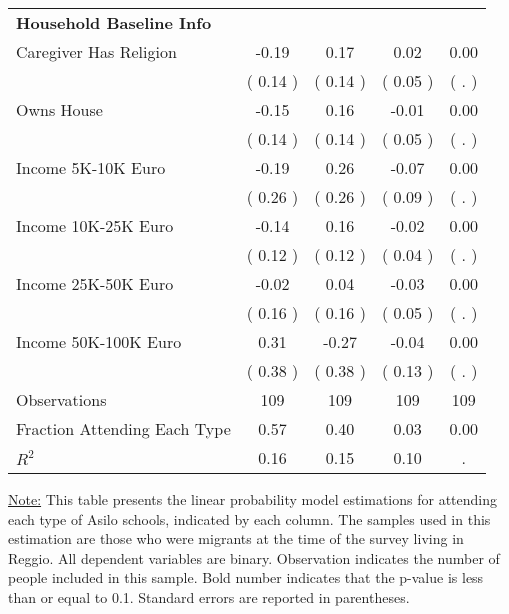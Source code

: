 \begin{table}[H]
{\begin{tabular}{lcccc}
\midrule
\textbf{Household Baseline Info} \\
\quad Caregiver Has Religion &     -0.19 &      0.17 &      0.02 &      0.00 \\
\quad  & (     0.14 ) & (     0.14 )  & (     0.05 )  & (        . )  \\
\quad Owns House &     -0.15 &      0.16 &     -0.01 &      0.00 \\
\quad  & (     0.14 ) & (     0.14 )  & (     0.05 )  & (        . )  \\
\quad Income 5K-10K Euro &     -0.19 &      0.26 &     -0.07 &      0.00 \\
\quad  & (     0.26 ) & (     0.26 )  & (     0.09 )  & (        . )  \\
\quad Income 10K-25K Euro &     -0.14 &      0.16 &     -0.02 &      0.00 \\
\quad  & (     0.12 ) & (     0.12 )  & (     0.04 )  & (        . )  \\
\quad Income 25K-50K Euro &     -0.02 &      0.04 &     -0.03 &      0.00 \\
\quad  & (     0.16 ) & (     0.16 )  & (     0.05 )  & (        . )  \\
\quad Income 50K-100K Euro &      0.31 &     -0.27 &     -0.04 &      0.00 \\
\quad  & (     0.38 ) & (     0.38 )  & (     0.13 )  & (        . )  \\
\midrule
Observations & 109 & 109 & 109 & 109 \\
Fraction Attending Each Type &      0.57 &      0.40 &      0.03 &      0.00 \\
\midrule
$ R^2$ &      0.16 &      0.15 &      0.10 &         . \\
\bottomrule
\end{tabular}}
\end{table}
\begin{scriptsize}
\noindent\underline{Note:} This table presents the linear probability model estimations for attending each type of Asilo schools, indicated by each column. The samples used in this estimation are those who were migrants at the time of the survey living in Reggio. All dependent variables are binary. Observation indicates the number of people included in this sample. Bold number indicates that the p-value is less than or equal to 0.1. Standard errors are reported in parentheses.
\end{scriptsize}
